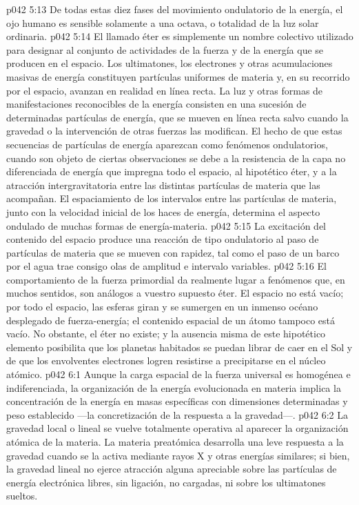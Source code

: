 \vs p042 5:13 \pc De todas estas diez fases del movimiento ondulatorio de la energía, el ojo humano es sensible solamente a una octava, o totalidad de la luz solar ordinaria.
\vs p042 5:14 \pc El llamado éter es simplemente un nombre colectivo utilizado para designar al conjunto de actividades de la fuerza y de la energía que se producen en el espacio. Los ultimatones, los electrones y otras acumulaciones masivas de energía constituyen partículas uniformes de materia y, en su recorrido por el espacio, avanzan en realidad en línea recta. La luz y otras formas de manifestaciones reconocibles de la energía consisten en una sucesión de determinadas partículas de energía, que se mueven en línea recta salvo cuando la gravedad o la intervención de otras fuerzas las modifican. El hecho de que estas secuencias de partículas de energía aparezcan como fenómenos ondulatorios, cuando son objeto de ciertas observaciones se debe a la resistencia de la capa no diferenciada de energía que impregna todo el espacio, al hipotético éter, y a la atracción intergravitatoria entre las distintas partículas de materia que las acompañan. El espaciamiento de los intervalos entre las partículas de materia, junto con la velocidad inicial de los haces de energía, determina el aspecto ondulado de muchas formas de energía\hyp{}materia.
\vs p042 5:15 La excitación del contenido del espacio produce una reacción de tipo ondulatorio al paso de partículas de materia que se mueven con rapidez, tal como el paso de un barco por el agua trae consigo olas de amplitud e intervalo variables.
\vs p042 5:16 El comportamiento de la fuerza primordial da realmente lugar a fenómenos que, en muchos sentidos, son análogos a vuestro supuesto éter. El espacio no está vacío; por todo el espacio, las esferas giran y se sumergen en un inmenso océano desplegado de fuerza\hyp{}energía; el contenido espacial de un átomo tampoco está vacío. No obstante, el éter no existe; y la ausencia misma de este hipotético elemento posibilita que los planetas habitados se puedan librar de caer en el Sol y de que los envolventes electrones logren resistirse a precipitarse en el núcleo atómico.
\vs p042 6:1 Aunque la carga espacial de la fuerza universal es homogénea e indiferenciada, la organización de la energía evolucionada en materia implica la concentración de la energía en masas específicas con dimensiones determinadas y peso establecido ---la concretización de la respuesta a la gravedad---.
\vs p042 6:2 La gravedad local o lineal se vuelve totalmente operativa al aparecer la organización atómica de la materia. La materia preatómica desarrolla una leve respuesta a la gravedad cuando se la activa mediante rayos X y otras energías similares; si bien, la gravedad lineal no ejerce atracción alguna apreciable sobre las partículas de energía electrónica libres, sin ligación, no cargadas, ni sobre los ultimatones sueltos.
